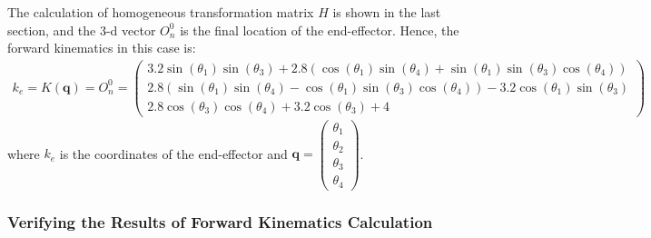 \documentclass[11pt]{article}
\begin{document}
The calculation of homogeneous transformation matrix $H$ is shown in the last section, and the 3-d vector $O_{n}^{0}$ is the final location of the end-effector. Hence, the forward kinematics in this case is:
\begin{equation}
\begin{split}
k_{e}=K(\mathbf{q})=O_{n}^{0}=\begin{pmatrix}3.2\sin \left(\theta _{1}\right)\sin \left(\theta _{3}\right)+2.8\left(\cos \left(\theta _{1}\right)\sin \left(\theta _{4}\right)+\sin \left(\theta _{1}\right)\sin \left(\theta _{3}\right)\cos \left(\theta _{4}\right)\right)\\ 2.8\left(\sin \left(\theta _{1}\right)\sin \left(\theta _{4}\right)-\cos \left(\theta _{1}\right)\sin \left(\theta _{3}\right)\cos \left(\theta _{4}\right)\right)-3.2\cos \left(\theta _{1}\right)\sin \left(\theta _{3}\right)\\ 2.8\cos \left(\theta _{3}\right)\cos \left(\theta _{4}\right)+3.2\cos \left(\theta _{3}\right)+4\end{pmatrix}
\end{split}
\end{equation}
where $k_{e}$ is the coordinates of the end-effector and $\mathbf{q}=\begin{pmatrix}\theta_{1}\\ \theta_{2}\\ \theta_{3}\\ \theta_{4}\end{pmatrix}$.

\subsubsection{Verifying the Results of Forward Kinematics Calculation}
\end{document}
